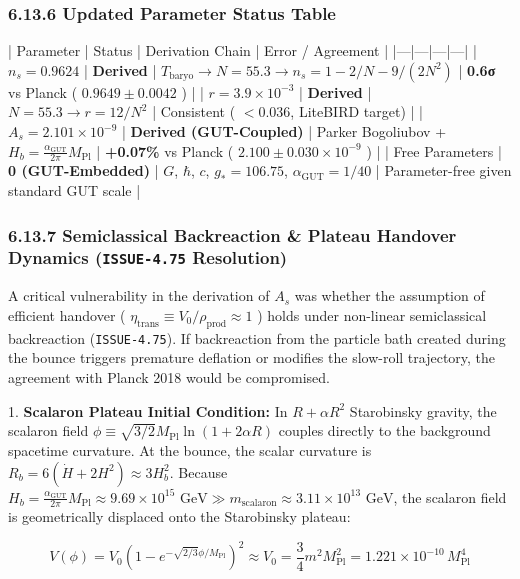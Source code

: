 \documentclass[11pt,a4paper]{article}
\theoremstyle{definition}
\theoremstyle{remark}
\begin{document}
\subsubsection{6.13.6 Updated Parameter Status Table}

| Parameter | Status | Derivation Chain | Error / Agreement |
|---|---|---|---|
| $n_s = 0.9624$ | \textbf{Derived} | $T_{\text{baryo}} \to N = 55.3 \to n_s = 1 - 2/N - 9/(2N^2)$ | \textbf{0.6σ} vs Planck ( $0.9649 \pm 0.0042$ ) |
| $r = 3.9 \times 10^{-3}$ | \textbf{Derived} | $N = 55.3 \to r = 12/N^2$ | Consistent ( $< 0.036$, LiteBIRD target) |
| $A_s = 2.101 \times 10^{-9}$ | \textbf{Derived (GUT-Coupled)} | Parker Bogoliubov + $H_b = \frac{\alpha_{\text{GUT}}}{2\pi} M_{\text{Pl}}$ | \textbf{+0.07\%} vs Planck ( $2.100 \pm 0.030 \times 10^{-9}$ ) |
| Free Parameters | \textbf{0 (GUT-Embedded)} | $G$, $\hbar$, $c$, $g_* = 106.75$, $\alpha_{\text{GUT}} = 1/40$ | Parameter-free given standard GUT scale |

\subsubsection{6.13.7 Semiclassical Backreaction \& Plateau Handover Dynamics (\texttt{ISSUE-4.75} Resolution)}

A critical vulnerability in the derivation of $A_s$ was whether the assumption of efficient handover ( $\eta_{\text{trans}} \equiv V_0 / \rho_{\text{prod}} \approx 1$ ) holds under non-linear semiclassical backreaction (\texttt{ISSUE-4.75}). If backreaction from the particle bath created during the bounce triggers premature deflation or modifies the slow-roll trajectory, the agreement with Planck 2018 would be compromised.

1. \textbf{Scalaron Plateau Initial Condition:}
In $R + \alpha R^2$ Starobinsky gravity, the scalaron field $\phi \equiv \sqrt{3/2} M_{\text{Pl}} \ln(1 + 2\alpha R)$ couples directly to the background spacetime curvature. At the bounce, the scalar curvature is $R_b = 6(\dot{H} + 2H^2) \approx 3 H_b^2$. Because $H_b = \frac{\alpha_{\text{GUT}}}{2\pi} M_{\text{Pl}} \approx 9.69 \times 10^{15}\text{ GeV} \gg m_{\text{scalaron}} \approx 3.11 \times 10^{13}\text{ GeV}$, the scalaron field is geometrically displaced onto the Starobinsky plateau:


\begin{equation}
V(\phi) = V_0 \left(1 - e^{-\sqrt{2/3}\phi/M_{\text{Pl}}}\right)^2 \approx V_0 = \frac{3}{4} m^2 M_{\text{Pl}}^2 = 1.221 \times 10^{-10} \, M_{\text{Pl}}^4
\end{equation}
\end{document}
